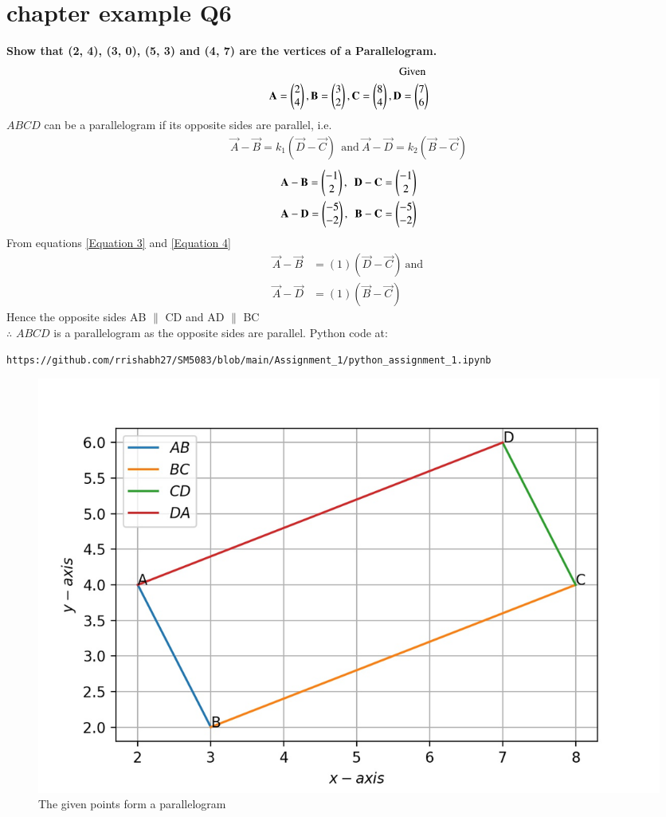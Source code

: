 \documentclass[journal,12pt,twocolumn]{IEEEtran}
\begin{document}
\section{ chapter   example  Q6 }
\textbf{Show that (2, 4), (3, 0), (5, 3) and (4, 7) are the vertices of a Parallelogram.}
\solution
\begin{align}
    ~\text{Given}~\\ \mathbf{A} = \begin{pmatrix}2\\4\end{pmatrix}, \mathbf{B} = \begin{pmatrix}3\\2\end{pmatrix}, \mathbf{C} = \begin{pmatrix}8\\4\end{pmatrix}, \mathbf{D} = \begin{pmatrix}7\\6\end{pmatrix}
\end{align}
$ABCD$ can be a parallelogram if its opposite sides are parallel, i.e.
\begin{align}
    \vec{A} - \vec{B} = k_1 ( \vec{D} - \vec{C} )\ ~\text{and}~
    \vec{A} - \vec{D} = k_2 ( \vec{B} - \vec{C} ) 
\end{align}
\begin{align}
\label{Equation 3}
\mathbf{A} - \mathbf{B} = \begin{pmatrix}-1\\2\end{pmatrix},~~
\mathbf{D} - \mathbf{C} = \begin{pmatrix}-1\\2\end{pmatrix}
\\
\mathbf {A} - \mathbf {D} = \begin{pmatrix}-5\\-2\end{pmatrix},~~
\mathbf {B} - \mathbf {C} =\begin{pmatrix}-5\\-2\end{pmatrix}
\label{Equation 4}
\end{align}
From equations  
    \eqref{Equation 3} and \eqref{Equation 4}
\begin{align}
    \vec{A} - \vec{B} &= (1) ( \vec{D} - \vec{C} ) \nonumber
    ~\text{and}~\\
    \vec{A} - \vec{D}& = (1) ( \vec{B} - \vec{C} ) 
\end{align}
Hence the opposite sides AB $\parallel$ CD and AD $\parallel$ BC \\
$\therefore$ $ABCD$ is a parallelogram as the opposite sides are parallel.
%
\newline Python code at:
\begin{lstlisting}
https://github.com/rrishabh27/SM5083/blob/main/Assignment_1/python_assignment_1.ipynb
\end{lstlisting}




\begin{figure}[!ht]
	\centering
	\includegraphics[width=\columnwidth]{parallelogram.jpg}
	\caption{The given points form a parallelogram}
	\label{fig:parallelogram}
\end{figure}
\end{document}
